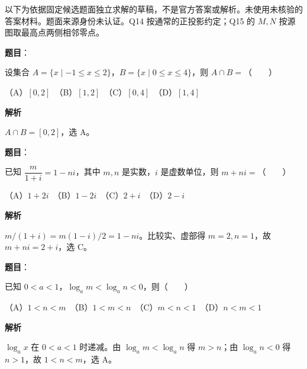 

\begin{gktip}
以下为依据固定候选题面独立求解的草稿，不是官方答案或解析。未使用未核验的答案材料。题面来源身份未认证。Q14 按通常的正投影约定；Q15 的 $M,N$ 按源图取最高点两侧相邻零点。
\end{gktip}

\begin{answer}

\textbf{题目}：

设集合 $A=\{x\mid -1\leqslant x\leqslant2\}$，$B=\{x\mid 0\leqslant x\leqslant4\}$，则 $A\cap B=$\mbox{（　　）}

（A）$[0,2]$　（B）$[1,2]$　（C）$[0,4]$　（D）$[1,4]$

\textbf{解析}

$A\cap B=[0,2]$，选 A。


\end{answer}
\begin{answer}

\textbf{题目}：

已知 $\dfrac{m}{1+i}=1-ni$，其中 $m,n$ 是实数，$i$ 是虚数单位，则 $m+ni=$\mbox{（　　）}

（A）$1+2i$　（B）$1-2i$　（C）$2+i$　（D）$2-i$

\textbf{解析}

$m/(1+i)=m(1-i)/2=1-ni$。比较实、虚部得 $m=2,n=1$，故 $m+ni=2+i$，选 C。


\end{answer}
\begin{answer}

\textbf{题目}：

已知 $0<a<1$，$\log_a m<\log_a n<0$，则\mbox{（　　）}

（A）$1<n<m$　（B）$1<m<n$　（C）$m<n<1$　（D）$n<m<1$

\textbf{解析}

$\log_a x$ 在 $0<a<1$ 时递减。由 $\log_a m<\log_a n$ 得 $m>n$；由 $\log_a n<0$ 得 $n>1$，故 $1<n<m$，选 A。


\end{answer}
